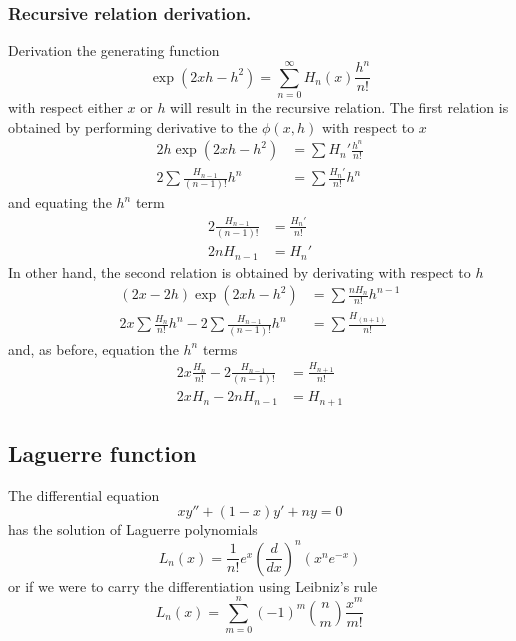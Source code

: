 \documentclass[../main.tex]{subfiles}
\begin{document}
\subsubsection*{Recursive relation derivation.} 
Derivation the generating function
\begin{equation*}
    \exp(2xh-h^2)=\sum_{n=0}^{\infty}H_n(x)\frac{h^n}{n!}
\end{equation*}
with respect either $x$ or $h$ will result in the recursive relation.
The first relation is obtained by performing derivative to the $\phi(x,h)$ with respect to $x$
\begin{align*}
    2h\exp(2xh-h^2)&=\sum H_n'\frac{h^n}{n!}\\
    2\sum\frac{H_{n-1}}{(n-1)!}h^n&=\sum \frac{H_n'}{n!}h^n
\end{align*}
and equating the $h^n$ term 
\begin{align*}
    2\frac{H_{n-1}}{(n-1)!}&=\frac{H_n'}{n!}\\
    2nH_{n-1}&=H_n'
\end{align*}
In other hand, the second relation is obtained by derivating with respect to $h$
\begin{align*}
    (2x-2h)\exp(2xh-h^2)&=\sum\frac{nH_n}{n!}h^{n-1}\\
    2x\sum \frac{H_n}{n!}h^n-2 \sum \frac{H_{n-1}}{(n-1)!}h^n &=\sum \frac{H_(n+1)}{n!}
\end{align*}
and, as before, equation the $h^n$ terms 
\begin{align*}
    2x\frac{H_n}{n!}-2\frac{H_{n-1}}{(n-1)!}&=\frac{H_{n+1}}{n!}\\
    2xH_n-2nH_{n-1}&=H_{n+1}
\end{align*}

\subsection*{Laguerre function}
The differential equation
\begin{equation*}
    xy''+(1-x)y'+ny=0
\end{equation*}
has the solution of Laguerre polynomials
\begin{equation*}
    L_n(x)=\frac{1}{n!}e^x\left(\frac{d}{dx}\right)^n(x^ne^{-x})
\end{equation*}
or if we were to carry the differentiation using Leibniz's rule
\begin{equation*}
    L_n(x)=\sum_{m=0}^{n}(-1)^m\binom{n}{m}\frac{x^m}{m!}
\end{equation*}
\end{document}
